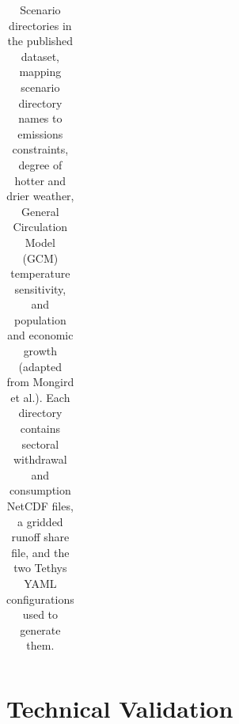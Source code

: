 \documentclass[fleqn,10pt]{wlscirep}
\begin{document}
\begin{table}[!ht]
\begin{tabular}{llllll}
\end{tabular}
\caption{Scenario directories in the published dataset\cite{bracken2026TethysDataSet}, mapping scenario directory names to emissions constraints, degree of hotter and drier weather, General Circulation Model (GCM) temperature sensitivity, and population and economic growth (adapted from Mongird et al.\cite{Mongird2025CERF}). Each directory contains sectoral withdrawal and consumption NetCDF files, a gridded runoff share file, and the two Tethys YAML configurations used to generate them.}
\label{tab:scenarios}
\end{table}

\section*{Technical Validation}
\end{document}
